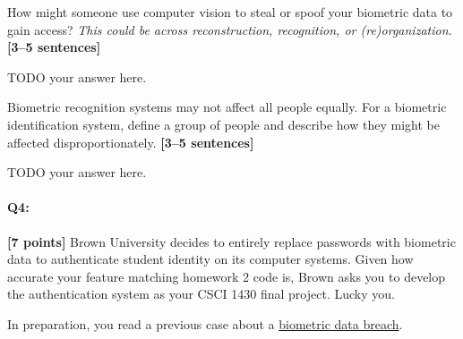\documentclass{csci1430}
\begin{document}
\pagebreak

\begin{subquestion}[points=3]
How might someone use computer vision to steal or spoof your biometric data to gain access? \emph{This could be across reconstruction, recognition, or (re)organization.} \textbf{[3--5 sentences]}
\end{subquestion}

\begin{answer}
TODO your answer here.
\end{answer}
    

\begin{subquestion}[points=3]
Biometric recognition systems may not affect all people equally. For a biometric identification system, define a group of people and describe how they might be affected disproportionately. \textbf{[3--5 sentences]}
\end{subquestion}
    
\begin{answer}
TODO your answer here.
\end{answer}
    

\pagebreak

\paragraph{Q4:} \textbf{[7 points]} Brown University decides to entirely replace passwords with biometric data to authenticate student identity on its computer systems. Given how accurate your feature matching homework 2 code is, Brown asks you to develop the authentication system as your CSCI 1430 final project. Lucky you.

In preparation, you read a previous case about a \href{https://www.vpnmentor.com/blog/report-biostar2-leak/}{biometric data breach}.
\end{document}
